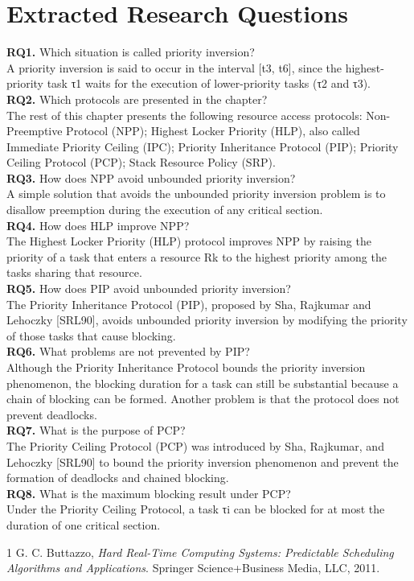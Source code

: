 \documentclass[conference]{IEEEtran}
\begin{document}
\section{Extracted Research Questions}
\textbf{RQ1.} Which situation is called priority inversion?\\ A priority inversion is said to occur in the interval [t3, t6], since the highest-priority task τ1 waits for the execution of lower-priority tasks (τ2 and τ3). \cite{Buttazzo2011}\\
\textbf{RQ2.} Which protocols are presented in the chapter?\\ The rest of this chapter presents the following resource access protocols: Non-Preemptive Protocol (NPP); Highest Locker Priority (HLP), also called Immediate Priority Ceiling (IPC); Priority Inheritance Protocol (PIP); Priority Ceiling Protocol (PCP); Stack Resource Policy (SRP). \cite{Buttazzo2011}\\
\textbf{RQ3.} How does NPP avoid unbounded priority inversion?\\ A simple solution that avoids the unbounded priority inversion problem is to disallow preemption during the execution of any critical section. \cite{Buttazzo2011}\\
\textbf{RQ4.} How does HLP improve NPP?\\ The Highest Locker Priority (HLP) protocol improves NPP by raising the priority of a task that enters a resource Rk to the highest priority among the tasks sharing that resource. \cite{Buttazzo2011}\\
\textbf{RQ5.} How does PIP avoid unbounded priority inversion?\\ The Priority Inheritance Protocol (PIP), proposed by Sha, Rajkumar and Lehoczky [SRL90], avoids unbounded priority inversion by modifying the priority of those tasks that cause blocking. \cite{Buttazzo2011}\\
\textbf{RQ6.} What problems are not prevented by PIP?\\ Although the Priority Inheritance Protocol bounds the priority inversion phenomenon, the blocking duration for a task can still be substantial because a chain of blocking can be formed. Another problem is that the protocol does not prevent deadlocks. \cite{Buttazzo2011}\\
\textbf{RQ7.} What is the purpose of PCP?\\ The Priority Ceiling Protocol (PCP) was introduced by Sha, Rajkumar, and Lehoczky [SRL90] to bound the priority inversion phenomenon and prevent the formation of deadlocks and chained blocking. \cite{Buttazzo2011}\\
\textbf{RQ8.} What is the maximum blocking result under PCP?\\ Under the Priority Ceiling Protocol, a task τi can be blocked for at most the duration of one critical section. \cite{Buttazzo2011}\\
\begin{thebibliography}{1}
 G. C. Buttazzo, \emph{Hard Real-Time Computing Systems: Predictable Scheduling Algorithms and Applications}. Springer Science+Business Media, LLC, 2011.
\end{thebibliography}
\end{document}
